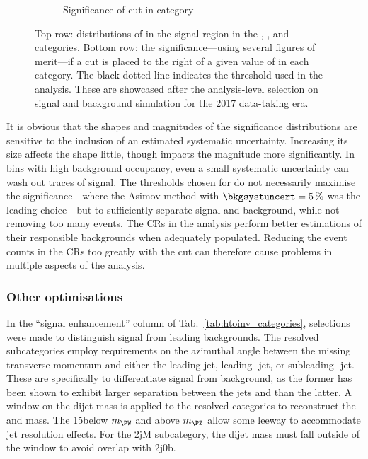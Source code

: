 \begin{figure}[htbp]
\begin{subfigure}[b]{0.27\textwidth}
        \caption{Significance of cut in \ggH category}
    \end{subfigure}
    \caption[Distributions of \omegaTilde in the signal region in the \ttH, \VH, and \ggH categories, along with the significance---using several figures of merit---if a cut is placed to the right of a given value]{Top row: distributions of \omegaTilde in the signal region in the \ttH, \VH, and \ggH categories. Bottom row: the significance---using several figures of merit---if a cut is placed to the right of a given value of \omegaTilde in each category. The black dotted line indicates the threshold used in the analysis. These are showcased after the analysis-level selection on signal and background simulation for the 2017 data-taking era.}
    \label{fig:htoinv_category_optimisations_significances}
\end{figure}


It is obvious that the shapes and magnitudes of the significance distributions are sensitive to the inclusion of an estimated systematic uncertainty. Increasing its size affects the shape little, though impacts the magnitude more significantly. In bins with high background occupancy, even a small systematic uncertainty can wash out traces of signal. The thresholds chosen for \omegaTilde do not necessarily maximise the significance---where the Asimov method with $\bkgsystuncert = \text{5\,\%}$ was the leading choice---but to sufficiently separate signal and background, while not removing too many events. The \glspl{CR} in the analysis perform better estimations of their responsible backgrounds when adequately populated. Reducing the event counts in the \glspl{CR} too greatly with the \omegaTilde cut can therefore cause problems in multiple aspects of the analysis.




\subsubsection{Other optimisations}
\label{subsubsec:htoinv_other_optimisations}

In the ``signal enhancement'' column of Tab.~\ref{tab:htoinv_categories}, selections were made to distinguish signal from leading backgrounds. The \ttH resolved subcategories employ requirements on the azimuthal angle between the missing transverse momentum and either the leading jet, leading \Pbottom-jet, or subleading \Pbottom-jet. These are specifically to differentiate \ttH signal from \ttbar background, as the former has been shown to exhibit larger separation between the \glspl{jet} and \ptmiss than the latter. A window on the dijet mass is applied to the \VH resolved categories to reconstruct the \PW and \PZ mass. The 15\GeV below $m_{\PW}$ and above $m_{\PZ}$ allow some leeway to accommodate jet resolution effects. For the \ggH 2jM subcategory, the dijet mass must fall outside of the window to avoid overlap with \VH 2j0b.
